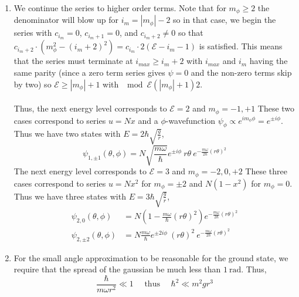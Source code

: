 \documentclass[12pt]{extarticle}
\begin{document}
\begin{enumerate}
\item We continue the series to higher order terms. Note that for $m_\phi \ge 2$ the denominator will blow up for $i_m = |m_\phi| - 2$ so in that case, we begin the series with $c_{i_m} = 0$, $c_{i_m + 1} = 0$, and $c_{i_m + 2} \neq 0$ so that $c_{i_m + 2} \cdot (m_\phi^2 - (i_m + 2)^2) = c_{i_m} \cdot 2(\mathcal{E} - i_m - 1)$ is satisfied. This means that the series must terminate at $i_{max} \ge  i_m + 2$ with $i_{max}$ and $i_m$ having the same parity (since a zero term series gives $\psi = 0$ and the non-zero terms skip by two) so $\mathcal{E} \ge |m_\phi| + 1$ with $\mod{\mathcal{E}}{(|m_\phi| + 1)}{2}$. \\ \\
Thus, the next energy level corresponds to $\mathcal{E} = 2$ and $m_\phi = -1, +1$ These two cases correspond to series $u = N x $ and a $\phi$-wavefunction $\psi_\phi \propto e^{i m_\phi \phi} = e^{\pm i \phi}$. Thus we have two states with $E = 2 \hbar \sqrt{\frac{g}{r}}$,
\[\psi_{1, \pm 1}(\theta, \phi) = N \sqrt{\frac{m \omega}{\hbar}} e^{\pm i \phi} \: r \theta \: e^{-\frac{m \omega}{2\hbar} (r \theta)^2} \]
The next energy level corresponds to $\mathcal{E} = 3$ and $m_\phi = -2, 0, +2$ These three cases correspond to series $u = Nx^2$ for $m_\phi = \pm 2$ and $N(1 - x^2)$ for $m_\phi = 0$. Thus we have three states with $E = 3 \hbar \sqrt{\frac{g}{r}}$,
\begin{align*}
\psi_{2, 0}(\theta, \phi) &= N \left(1 -  \frac{m \omega}{\hbar} (r \theta)^2 \right) e^{-\frac{m \omega}{2\hbar} (r \theta)^2} \\
\psi_{2, \pm 2}(\theta, \phi) &= N \frac{m \omega}{\hbar} e^{\pm 2 i \phi} \: (r \theta)^2 \: e^{-\frac{m \omega}{2\hbar} (r \theta)^2}
\end{align*}

\item For the small angle approximation to be reasonable for the ground state, we require that the spread of the gaussian be much less than $1 \: \mathrm{rad}$. Thus, \[\frac{\hbar}{m \omega r^2} \ll 1 \quad \text{ thus } \quad \hbar^2 \ll m^2 g r^3\]
\end{enumerate}
\end{document}

